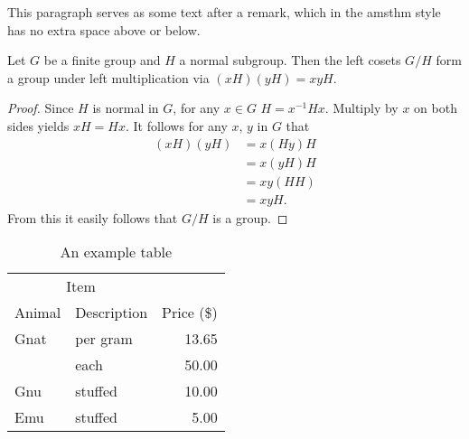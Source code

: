 \documentclass{article}
\begin{document}
This paragraph serves as some text after a remark, which in the
amsthm style has no extra space above or below.


\begin{theorem}
  Let $G$ be a finite group and $H$ a normal subgroup.
  Then the left cosets $G / H$ form a group under
  left multiplication via $(xH)(yH) = xyH$.
\end{theorem}

\begin{proof}
  Since $H$ is normal in $G$, for any $x \in G$
  $H =  x^{-1}Hx$. Multiply by $x$ on both sides yields
  $xH=Hx$. It follows for any
  $x$, $y$ in $G$ that
  \begin{align}
    (xH)(yH)
    &= x(Hy)H \\
    &= x(yH)H \\
    &= xy(HH) \\
    &=xyH.
  \end{align}
  From this it easily follows that $G / H$ is a group.
\end{proof}

\begin{table}\label{tab:1}
  \centering
  \begin{tabular}{@{}llr@{}} \toprule
  \multicolumn{2}{c}{Item} \\ \cmidrule(r){1-2}
  Animal & Description & Price (\$) \\ \midrule
  Gnat  & per gram  & 13.65 \\
        & each    & 50.00 \\
  Gnu   & stuffed & 10.00 \\
  Emu   & stuffed   & 5.00 \\
  \bottomrule
  \end{tabular}
  \caption{An example table}
\end{table}



\end{document}
